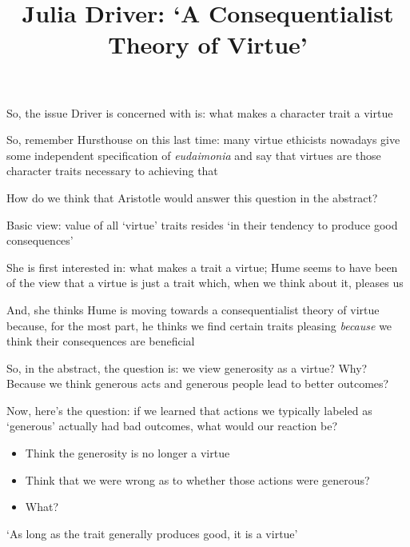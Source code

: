 \documentclass[11pt]{article}
\title{Julia Driver: `A Consequentialist Theory of Virtue'}
\author{}
\date{}
\begin{document}
\maketitle

\noindent So, the issue Driver is concerned with is: what makes a character trait a virtue
\vspace*{2mm}

\noindent So, remember Hursthouse on this last time: many virtue ethicists nowadays give some independent specification of \emph{eudaimonia} and say that virtues are those character traits necessary to achieving that
\vspace*{2mm}

\noindent How do we think that Aristotle would answer this question in the abstract?
\vspace*{2mm}

\noindent Basic view: value of all `virtue' traits resides `in their tendency to produce good consequences'
\vspace*{2mm}

\noindent She is first interested in: what makes a trait a virtue; Hume seems to have been of the view that a virtue is just a trait which, when we think about it, pleases us
\vspace*{2mm}

\noindent And, she thinks Hume is moving towards a consequentialist theory of virtue because, for the most part, he thinks we find certain traits pleasing \emph{because} we think their consequences are beneficial
\vspace*{2mm}

\noindent So, in the abstract, the question is: we view generosity as a virtue? Why? Because we think generous acts and generous people lead to better outcomes?
\vspace*{2mm}

\noindent Now, here's the question: if we learned that actions we typically labeled as `generous' actually had bad outcomes, what would our reaction be?

\begin{itemize}\item{Think the generosity is no longer a virtue}\item{Think that we were wrong as to whether those actions were generous?}\item{What?}\end{itemize}

\noindent `As long as the trait generally produces good, it is a virtue'
\vspace*{2mm}
\end{document}
